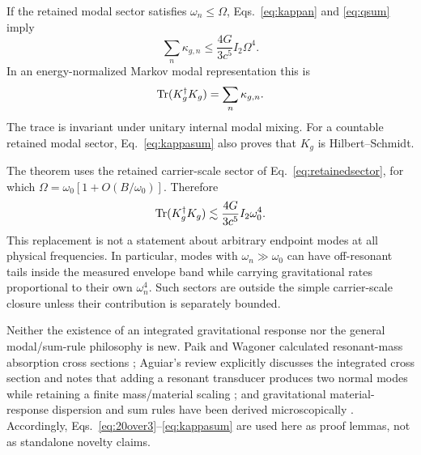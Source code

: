 If the retained modal sector satisfies $\omega_n\le\Omega$, Eqs.~\eqref{eq:kappan} and \eqref{eq:qsum} imply
\begin{equation}
\boxed{
\sum_n\kappa_{g,n}
\le
\frac{4G}{3c^5}I_2\Omega^4 .
}
\label{eq:kappasum}
\end{equation}
In an energy-normalized Markov modal representation this is
\begin{equation}
\operatorname{Tr}(K_g^\dagger K_g)=\sum_n\kappa_{g,n}.
\end{equation}
The trace is invariant under unitary internal modal mixing. For a countable retained modal sector, Eq.~\eqref{eq:kappasum} also proves that $K_g$ is Hilbert--Schmidt.

The theorem uses the retained carrier-scale sector of Eq.~\eqref{eq:retainedsector}, for which $\Omega=\omega_0[1+O(B/\omega_0)]$. Therefore
\begin{equation}
\operatorname{Tr}(K_g^\dagger K_g)
\lesssim
\frac{4G}{3c^5}I_2\omega_0^4 .
\label{eq:narrowresource}
\end{equation}
This replacement is not a statement about arbitrary endpoint modes at all physical frequencies. In particular, modes with $\omega_n\gg\omega_0$ can have off-resonant tails inside the measured envelope band while carrying gravitational rates proportional to their own $\omega_n^4$. Such sectors are outside the simple carrier-scale closure unless their contribution is separately bounded.

Neither the existence of an integrated gravitational response nor the general modal/sum-rule philosophy is new. Paik and Wagoner calculated resonant-mass absorption cross sections \cite{PaikWagoner1976}; Aguiar's review explicitly discusses the integrated cross section and notes that adding a resonant transducer produces two normal modes while retaining a finite mass/material scaling \cite{Aguiar2010}; and gravitational material-response dispersion and sum rules have been derived microscopically \cite{Srivastava2003}. Accordingly, Eqs.~\eqref{eq:20over3}--\eqref{eq:kappasum} are used here as proof lemmas, not as standalone novelty claims.
